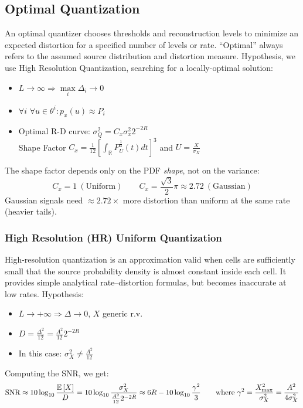 \subsection{Optimal Quantization}
An optimal quantizer chooses thresholds and reconstruction levels to minimize an expected distortion for a specified number of levels or rate. ``Optimal'' always refers to the assumed source distribution and distortion measure.
Hypothesis, we use High Resolution Quantization, searching for a locally-optimal solution:
\begin{itemize}
    \item $L \to \infty \Rightarrow \max\limits_i\Delta_i \to 0$
    \item $\forall i$ $\forall u \in \theta^i: p_x(u)\approx P_i$
    \item Optimal R-D curve: $\sigma^2_Q = C_x \sigma^2_x 2^{-2R}$\\
    Shape Factor $C_x = \frac{1}{12}\left[\int_{\mathbb{R}}P^{\frac{1}{3}}_U(t)dt\right]^3$ and $U = \frac{X}{\sigma_X}$
\end{itemize}
The shape factor depends only on the PDF \emph{shape}, not on the variance:
$$C_x = 1 \ (\text{Uniform}) \qquad C_x = \frac{\sqrt{3}}{2}\pi \approx 2.72 \ (\text{Gaussian})$$
Gaussian signals need $\approx 2.72\times$ more distortion than uniform at the same rate (heavier tails).
\subsubsection{High Resolution (HR) Uniform Quantization}
High-resolution quantization is an approximation valid when cells are sufficiently small that the source probability density is almost constant inside each cell. It provides simple analytical rate--distortion formulas, but becomes inaccurate at low rates.
Hypothesis:
\begin{itemize}
    \item $L \to +\infty \Rightarrow \Delta \to 0$, $X$ generic r.v.
    \item $D = \frac{\Delta^2}{12} = \frac{A^2}{12}2^{-2R}$
    \item In this case: $\sigma^2_X \neq \frac{A^2}{12}$
\end{itemize}
Computing the SNR, we get:
$$\text{SNR} \approx10\log_{10}\frac{\mathbb{E}\left[X\right]}{D} = 10\log_{10} \frac{\sigma^2_X}{\frac{A^2}{12}2^{-2R}} \approx 6R - 10\log_{10}\frac{\gamma^2}{3} \qquad\text{where }\gamma^2 = \frac{X_{\max}^2}{\sigma_X^2} = \frac{A^2}{4\sigma_X^2}$$
